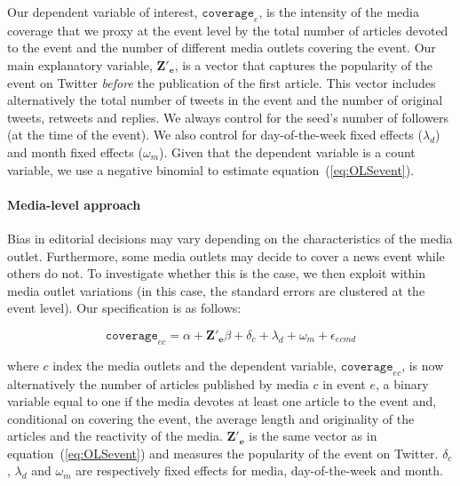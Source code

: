 Our dependent variable of interest, $\mathtt{coverage}_{e}$, is the intensity of the media coverage that we proxy at the event level by the total number of articles devoted to the event and the number of different media outlets covering the event. Our main explanatory variable, $\mathbf{Z'_{e}}$, is a  vector that captures the popularity of the event on Twitter \textit{before} the publication of the first article. This vector includes alternatively the total number of tweets in the event and the number of original tweets, retweets and replies. We always control for the seed's number of followers (at the time of the event). We also control for day-of-the-week fixed effects ($\lambda_d$) and month fixed effects ($\omega_m$). Given that the dependent variable is a count variable, we use a negative binomial to estimate equation~(\ref{eq:OLSevent}).


\paragraph{Media-level approach}

Bias in editorial decisions may vary depending on the characteristics of the media outlet. Furthermore, some media outlets may decide to cover a news event while others do not. To investigate whether this is the case, we then exploit within media outlet variations (in this case, the standard errors are clustered at the event level). Our specification is as follows: 

\begin{equation}
\mathtt{coverage}_{ec}= \alpha + \mathbf{Z'_{e}}\beta +  \delta_{c}  + \lambda_d + \omega_m +\epsilon_{ecmd}
\label{eq:OLSmedia}
\end{equation}

\noindent where $c$ index the media outlets and the dependent variable, $\mathtt{coverage}_{ec}$, is now alternatively the number of articles published by media $c$ in event $e$, a binary variable equal to one if the media devotes at least one article to the event and, conditional on covering the event, the average length and originality of the articles and the reactivity of the media. $\mathbf{Z'_{e}}$ is the same vector as in equation~(\ref{eq:OLSevent}) and measures the popularity of the event on Twitter. $\delta_{c}$,  $\lambda_d$ and $\omega_m$ are respectively fixed effects for media, day-of-the-week and month.



